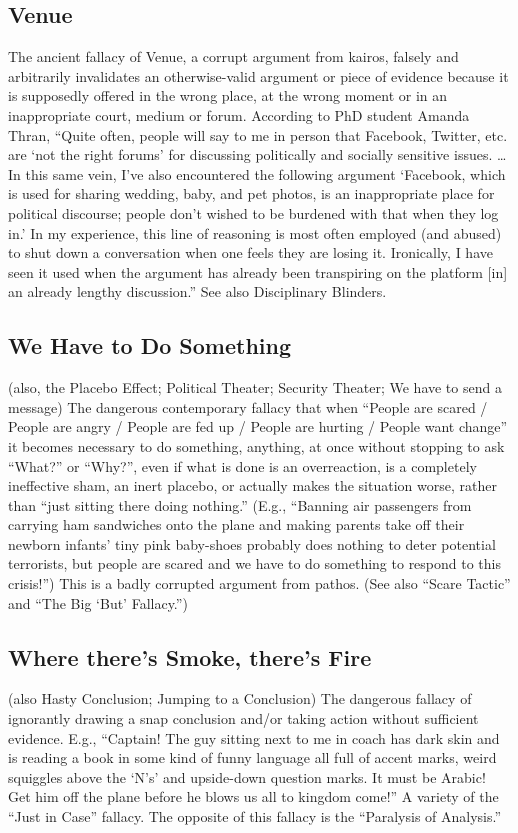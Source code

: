 \documentclass[10pt,a4paper,british]{article}
\begin{document}
\begin{multicols}{2}
    \subsection{Venue} The ancient fallacy of Venue, a corrupt argument from kairos, falsely and arbitrarily invalidates an otherwise{-}valid argument or piece of evidence because it is supposedly offered in the wrong place, at the wrong moment or in an inappropriate court, medium or forum.  According to PhD student Amanda Thran, ``Quite often, people will say to me in person that Facebook, Twitter, etc. are `not the right forums' for discussing politically and socially sensitive issues. \ldots In this same vein, I’ve also encountered the following argument `Facebook, which is used for sharing wedding, baby, and pet photos, is an inappropriate place for political discourse; people don’t wished to be burdened with that when they log in.' In my experience, this line of reasoning is most often employed (and abused) to shut down a conversation when one feels they are losing it.  Ironically, I have seen it used when the argument has already been transpiring on the platform [in] an already lengthy discussion.'' See also Disciplinary Blinders.  

    \subsection{We Have to Do Something} (also,  the Placebo Effect; Political Theater; Security Theater; We have to send a message) The dangerous contemporary fallacy that when ``People are scared / People are angry / People are fed up / People are hurting / People want change'' it becomes necessary to do something, anything, at once without stopping to ask ``What?'' or ``Why?'', even if what is done is an overreaction, is a completely ineffective sham, an inert placebo, or actually makes the situation worse, rather than ``just sitting there doing nothing.'' (E.g., ``Banning air passengers from carrying ham sandwiches onto the plane and making parents take off their newborn infants' tiny pink baby{-}shoes probably does nothing to deter potential terrorists, but people are scared and we have to do something to respond to this crisis!'') This is a badly corrupted argument from pathos. (See also ``Scare Tactic'' and ``The Big `But' Fallacy.'') 

    \subsection{Where there’s Smoke, there’s Fire} (also Hasty Conclusion; Jumping to a Conclusion) The dangerous fallacy of ignorantly drawing a snap conclusion and/or taking action without sufficient evidence. E.g., “Captain! The guy sitting next to me in coach has dark skin and is reading a book in some kind of funny language all full of accent marks, weird squiggles above the `N's' and upside{-}down question marks. It must be Arabic! Get him off the plane before he blows us all to kingdom come!” A variety of the “Just in Case” fallacy. The opposite of this fallacy is the ``Paralysis of Analysis.'' 


\end{multicols}
\end{document}
